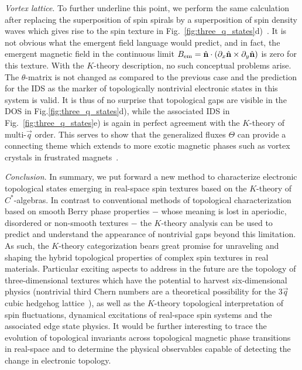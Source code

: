 \documentclass[
    10pt,
    aps,
    prr,
    twocolumn,
    floatfix,
    superscriptaddress
]{revtex4-2}
\newcommand{\SupplementalMaterial}{\cite{Note1}}
\newcommand{\revise}[1]{{\color{red} #1}}
\begin{document}
\revise{{\it Vortex lattice}.}
To further underline this point, we perform the same calculation after replacing the superposition of spin spirals by a superposition of spin density waves which gives rise to the spin texture in Fig.~\ref{fig:three_q_states}d)~\SupplementalMaterial. 
It is not obvious what the emergent field language would predict, and  
in fact, the emergent magnetic field in the continuous limit  $B_\mathrm{em} = \hat{\mathbf{n}} \cdot(\partial_x \hat{\mathbf{n}} \times \partial_y \hat{\mathbf{n}})$ is zero for this texture.
With the $K$-theory description, no such conceptual problems arise.
The $\theta$-matrix is not changed as compared to the previous case and the prediction for the IDS as the marker of topologically nontrivial electronic states in this system is valid. 
It is thus of no surprise that topological gaps are visible in the DOS in Fig.\ref{fig:three_q_states}d), while the associated IDS in Fig.~\ref{fig:three_q_states}e) is again in perfect agreement with the $K$-theory of multi-$\vec{q}$ order.
This serves to show that the generalized fluxes $\Theta$ can provide a connecting theme which extends to more exotic magnetic phases such as vortex crystals in frustrated magnets~\cite{Wang2015}.


\revise{{\it Conclusion}}.
In summary, we put forward a new method to characterize electronic topological states emerging in real-space spin textures based on the $K$-theory of $C^\ast$-algebras.
In contrast to conventional methods of topological characterization based on smooth Berry phase properties $-$ whose meaning is lost in aperiodic, disordered or non-smooth textures $-$ the $K$-theory analysis can be used to predict and understand the appearance of nontrivial gaps beyond this limitation. 
As such, the $K$-theory categorization bears great promise for unraveling and shaping the hybrid topological properties of complex spin textures in real materials.
Particular exciting aspects to address in the future are the topology of three-dimensional textures which have the potential to harvest six-dimensional physics (nontrivial third Chern numbers are a theoretical possibility for the 3$\vec{q}$ cubic hedgehog lattice~\SupplementalMaterial), as well as the $K$-theory topological interpretation of spin fluctuations, dynamical excitations of real-space spin systems and the associated edge state physics.
\revise{It would be further interesting to trace the evolution of topological invariants across topological magnetic phase transitions in real-space and to determine the physical observables capable of detecting the change in electronic topology.}
\end{document}
